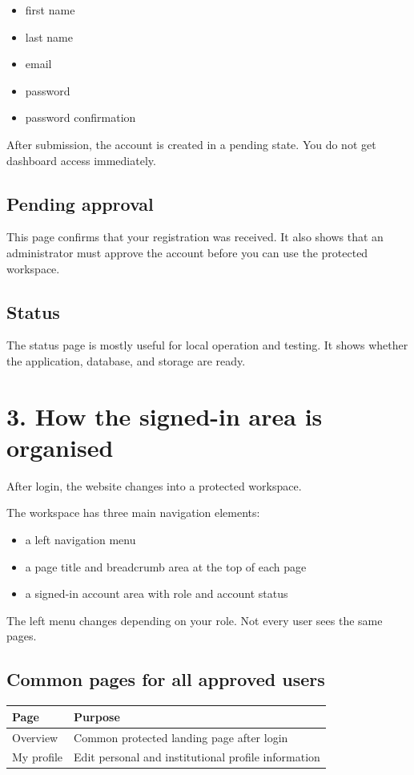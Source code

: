 \documentclass[11pt,a4paper]{article}
\begin{document}
\begin{itemize}
  \item first name
  \item last name
  \item email
  \item password
  \item password confirmation
\end{itemize}

After submission, the account is created in a pending state. You do not get dashboard access immediately.

\subsection*{Pending approval}
This page confirms that your registration was received. It also shows that an administrator must approve the account before you can use the protected workspace.

\subsection*{Status}
The status page is mostly useful for local operation and testing. It shows whether the application, database, and storage are ready.

\section*{3. How the signed-in area is organised}
After login, the website changes into a protected workspace.

The workspace has three main navigation elements:

\begin{itemize}
  \item a left navigation menu
  \item a page title and breadcrumb area at the top of each page
  \item a signed-in account area with role and account status
\end{itemize}

The left menu changes depending on your role. Not every user sees the same pages.

\subsection*{Common pages for all approved users}
\begin{longtable}{>{\raggedright\arraybackslash}p{4cm} >{\raggedright\arraybackslash}p{9.3cm}}
\rowcolor{swusurface}\textbf{Page} & \textbf{Purpose} \\
\midrule
Overview & Common protected landing page after login \\
My profile & Edit personal and institutional profile information \\
\end{longtable}
\end{document}
